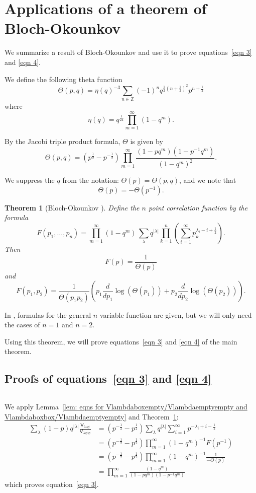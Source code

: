 \documentclass[12pt]{amsart}
\newcommand{\znums} {{\mathbb Z}}		%
\newcommand{\Vsf}{\mathsf{V}}
\newcommand{\bx}{\square}
\renewcommand{\emptyset}{\varnothing}
\newcommand{\half}{\frac{1}{2}}
\newtheorem{theorem}{Theorem}%
\theoremstyle{definition}
\begin{document}
\section{Applications of a theorem of Bloch-Okounkov}
\label{sec: applications of the Bloch-Okounkov thm}

We summarize a result of Bloch-Okounkov \cite{Bloch-Okounkov} and use
it to prove equations~\eqref{eqn 3} and \eqref{eqn 4}.

We define the following theta function
\[
\Theta (p,q) = \eta (q)^{-3}\sum_{n\in \znums}
(-1)^{n}q^{\half (n+\half )^{2}} p^{n+\half } 
\]
where
\[
\eta (q) = q^{\frac{1}{24}}\prod_{m=1}^{\infty}(1-q^{m}).
\]

By the Jacobi triple product formula, $\Theta $ is given by
\[
\Theta (p,q) = (p^{\half} -p^{-\half})\prod_{m=1}^{\infty}
\frac{(1-pq^{m})(1-p^{-1}q^{m})}{(1-q^{m})^{2}}. 
\]

We suppress the $q$ from the notation: $\Theta (p) = \Theta (p,q)$, and
we note that
\[
\Theta (p) = -\Theta (p^{-1}).
\]

\begin{theorem}[Bloch-Okounkov \cite{Bloch-Okounkov}]\label{thm: Bloch-Okounkov thm}
Define the $n$ point correlation function by the formula
\[
F(p_{1},\dots ,p_{n}) = \prod_{m=1}^{\infty}(1-q^{m})\, \sum_{\lambda}
q^{|\lambda|} \prod_{k=1}^{n} \left(\sum_{i=1}^{\infty} p_{k}^{\lambda_{i}-i+\half } \right).
\]
Then
\[
F(p) = \frac{1}{\Theta (p)}
\]
and
\[
F(p_{1},p_{2}) = \frac{1}{\Theta
(p_{1}p_{2})}\left(p_{1}\frac{d}{dp_{1}}\log(\Theta (p_{1}))+ p_{2}\frac{d}{dp_{2}}\log(\Theta (p_{2})) \right).
\]
\end{theorem}

In \cite{Bloch-Okounkov}, formulas for the general $n$ variable
function are given, but we will only need the cases of $n=1$ and
$n=2$.

Using this theorem, we will prove equations~\eqref{eqn 3} and
\eqref{eqn 4} of the main theorem.

\subsection{Proofs of equations~\eqref{eqn 3} and \eqref{eqn
4}}\label{subsec: pfs of eqn 3 and 4} $\, $
    


We apply Lemma~\ref{lem: eqns for Vlambdaboxempty/Vlambdaemptyempty
and Vlambdaboxbox/Vlambdaemptyempty} and Theorem~\ref{thm: Bloch-Okounkov thm}:
\begin{align*}
\sum_{\lambda}(1-p) q^{|\lambda |} \frac{\Vsf_{\lambda \bx
\emptyset}}{\Vsf_{\lambda \emptyset \emptyset}} &=
(p^{-\half}-p^{\half}) \sum_{\lambda} q^{|\lambda |}\sum_{i=1}^{\infty}p^{-\lambda_{i}+i-\half}\\
&=(p^{-\half}-p^{\half}) \prod_{m=1}^{\infty}(1-q^{m})^{-1} F(p^{-1})\\
&=(p^{-\half}-p^{\half}) \prod_{m=1}^{\infty}(1-q^{m})^{-1} \frac{1}{-\Theta (p)}\\
&=\prod_{m=1}^{\infty} \frac{(1-q^{m})}{(1-pq^{m})(1-p^{-1}q^{m})}
\end{align*}
which proves equation~\eqref{eqn 3}.
\end{document}
